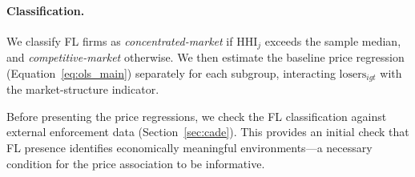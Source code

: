 \paragraph{Classification.}
We classify FL firms as \emph{concentrated-market} if
$\text{HHI}_j$ exceeds the sample median, and
\emph{competitive-market} otherwise. We then estimate the baseline
price regression (Equation~\ref{eq:ols_main}) separately for each
subgroup, interacting $\text{losers}_{igt}$ with the
market-structure indicator.

Before presenting the price regressions, we check the FL
classification against external enforcement data
(Section~\ref{sec:cade}). This provides an initial check that FL presence identifies
economically meaningful environments---a necessary condition for the
price association to be informative.
